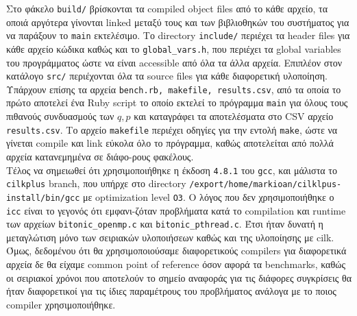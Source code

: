 \documentclass[11pt,a4paper,titlepage]{article}
\begin{document}
		Στο φάκελο \verb|build/| βρίσκονται τα compiled object files από το κάθε αρχείο, τα οποιά αργότερα γίνονται linked μεταξύ τους και των βιβλιοθηκών του συστήματος για να παράξουν το \verb|main| εκτελέσιμο. Το directory \verb|include/| περιέχει τα header files για κάθε αρχείο κώδικα καθώς και το \verb|global_vars.h|, που περιέχει τα global variables του προγράμματος ώστε να είναι accessible από όλα τα άλλα αρχεία. Επιπλέον στον κατάλογο \verb|src/| περιέχονται όλα τα source files για κάθε διαφορετική υλοποίηση.\\

		Υπάρχουν επίσης τα αρχεία \verb|bench.rb, makefile, results.csv|, από τα οποία το πρώτο αποτελεί ένα Ruby script  το οποίο εκτελεί το πρόγραμμα \verb|main| για όλους τους πιθανούς συνδυασμούς των $q,p$ και καταγράφει τα αποτελέσματα στο CSV αρχείο \verb|results.csv|. Το αρχείο \verb|makefile| περιέχει οδηγίες για την εντολή \verb|make|, ώστε να γίνεται compile και link εύκολα όλο το πρόγραμμα, καθώς αποτελείται από πολλά αρχεία κατανεμημένα σε διάφο-ρους φακέλους.\\
		
		Τέλος να σημειωθεί ότι χρησιμοποιήθηκε η έκδοση \verb|4.8.1| του \verb|gcc|, και μάλιστα το \verb|cilkplus| branch, που υπήρχε στο directory \verb|/export/home/markioan/cilklpus-install/bin/gcc| με optimization level \verb|O3|. O λόγος που δεν χρησιμοποιήθηκε ο \verb|icc| είναι το γεγονός ότι εμφανι-ζόταν προβλήματα κατά το compilation και runtime των αρχείων \verb|bitonic_openmp.c| και \verb|bitonic_pthread.c|. Έτσι ήταν δυνατή η μεταγλώτιση μόνο των σειριακών υλοποιήσεων καθώς και της υλοποίησης με cilk. Όμως, δεδομένου ότι θα χρησιμοποιούσαμε διαφορετικούς compilers για διαφορετικά αρχεία δε θα είχαμε common point of reference όσον αφορά τα benchmarks, καθώς οι σειριακοί χρόνοι που αποτελούν το σημείο αναφοράς για τις διάφορες συγκρίσεις θα ήταν διαφορετικοί για τις ίδιες παραμέτρους του προβλήματος ανάλογα με το ποιος compiler χρησιμοποιήθηκε.
\end{document}
